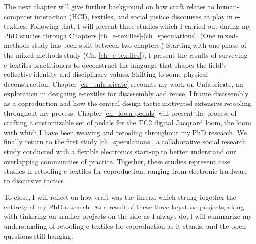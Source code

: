 The next chapter will give further background on how craft relates to human-computer interaction (HCI), textiles, and social justice discourses at play in e-textiles. Following that, I will present three studies which I carried out during my PhD studies through Chapters \ref{ch_e-textiles}-\ref{ch_speculations}. (One mixed-methods study has been split between two chapters.) 
Starting with one phase of the mixed-methods study (Ch. \ref{ch_e-textiles}), I present the results of surveying e-textiles practitioners to deconstruct the language that shapes the field's collective identity and disciplinary values. Shifting to some physical deconstruction, Chapter \ref{ch_unfabricate} recounts my work on Unfabricate, an exploration in designing e-textiles for disassembly and reuse. I frame disassembly as a coproduction and how the central design tactic motivated extensive retooling throughout my process. Chapter \ref{ch_loom-pedals} will present the process of crafting a customizable set of pedals for the TC2 digital Jacquard loom, the loom with which I have been weaving and retooling throughout my PhD research. We finally return to the first study \ref{ch_speculations}, a collaborative social research study conducted with a flexible electronics start-up to better understand our overlapping communities of practice. Together, these studies represent case studies in retooling e-textiles for coproduction, ranging from electronic hardware to discursive tactics.

To close, I will reflect on how craft was the thread which strung together the entirety of my PhD research. As a result of these three keystone projects, along with tinkering on smaller projects on the side as I always do, I will summarize my understanding of retooling e-textiles for coproduction as it stands, and the open questions still hanging.



